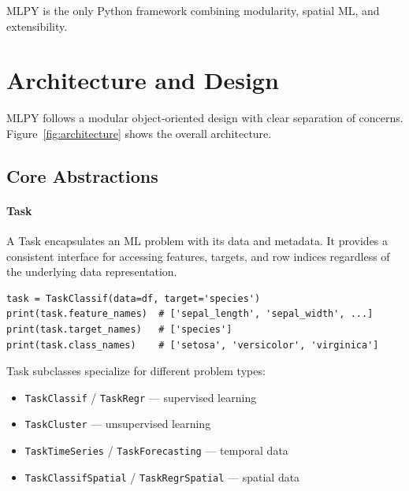 \documentclass[twoside,11pt]{article}
\begin{document}
MLPY is the only Python framework combining modularity, spatial ML, and
extensibility.

\section{Architecture and Design}
\label{sec:architecture}

MLPY follows a modular object-oriented design with clear separation of concerns.
Figure~\ref{fig:architecture} shows the overall architecture.


\subsection{Core Abstractions}

\paragraph{Task}
A Task encapsulates an ML problem with its data and metadata. It provides a
consistent interface for accessing features, targets, and row indices regardless
of the underlying data representation.

\begin{lstlisting}
task = TaskClassif(data=df, target='species')
print(task.feature_names)  # ['sepal_length', 'sepal_width', ...]
print(task.target_names)   # ['species']
print(task.class_names)    # ['setosa', 'versicolor', 'virginica']
\end{lstlisting}

Task subclasses specialize for different problem types:
\begin{itemize}
  \item \texttt{TaskClassif} / \texttt{TaskRegr} --- supervised learning
  \item \texttt{TaskCluster} --- unsupervised learning
  \item \texttt{TaskTimeSeries} / \texttt{TaskForecasting} --- temporal data
  \item \texttt{TaskClassifSpatial} / \texttt{TaskRegrSpatial} --- spatial data
\end{itemize}
\end{document}
